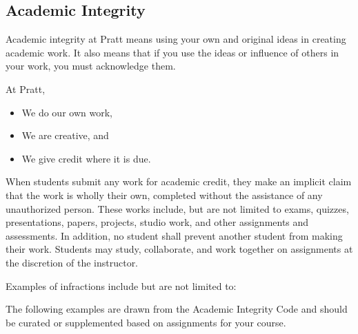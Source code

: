 \documentclass[12pt]{article}
\begin{document}
\subsection*{Academic Integrity}
\label{sec:orgdb37727}

Academic integrity at Pratt means using your own and original ideas in
creating academic work. It also means that if you use the ideas or
influence of others in your work, you must acknowledge them.

At Pratt,

\begin{itemize}
\item We do our own work,
\item We are creative, and
\item We give credit where it is due.
\end{itemize}

When students submit any work for academic credit, they make an
implicit claim that the work is wholly their own, completed without
the assistance of any unauthorized person. These works include, but
are not limited to exams, quizzes, presentations, papers, projects,
studio work, and other assignments and assessments. In addition, no
student shall prevent another student from making their work. Students
may study, collaborate, and work together on assignments at the
discretion of the instructor.

Examples of infractions include but are not limited to:

The following examples are drawn from the Academic Integrity Code and
should be curated or supplemented based on assignments for your
course.
\end{document}
